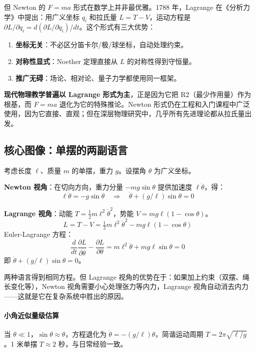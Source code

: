 但 Newton 的 $F = ma$ 形式在数学上并非最优雅。1788 年，Lagrange 在《分析力学》中提出：用广义坐标 $q_i$ 和拉氏量 $L = T - V$，运动方程是 $\partial L/\partial q_i = d(\partial L/\partial \dot{q}_i)/dt$。这个形式有三大优势：
\begin{enumerate}
\item \textbf{坐标无关}：不必区分笛卡尔/极/球坐标，自动处理约束。
\item \textbf{对称性显式}：Noether 定理直接从 $L$ 的对称性得到守恒量。
\item \textbf{推广无碍}：场论、相对论、量子力学都使用同一框架。
\end{enumerate}

\textbf{现代物理教学普遍以 Lagrange 形式为主}，正是因为它把 R2（最少作用量）作为根基，而 $F = ma$ 退化为它的特殊推论。Newton 形式仍在工程和入门课程中广泛使用，因为它直接、直观；但在深层物理研究中，几乎所有先进理论都从拉氏量出发。

\subsection{核心图像：单摆的两副语言}

考虑长度 $\ell$、质量 $m$ 的单摆，重力 $g$。设摆角 $\theta$ 为广义坐标。

\textbf{Newton 视角}：在切向方向，重力分量 $-mg\sin\theta$ 提供加速度 $\ell\ddot\theta$，得：
\[
\ell\ddot\theta = -g\sin\theta \quad \Rightarrow \quad \ddot\theta + (g/\ell)\sin\theta = 0
\]

\textbf{Lagrange 视角}：动能 $T = \tfrac{1}{2}m\ell^2\dot\theta^2$，势能 $V = mg\ell(1-\cos\theta)$。
\[
L = T - V = \tfrac{1}{2}m\ell^2\dot\theta^2 - mg\ell(1-\cos\theta)
\]
Euler-Lagrange 方程：
\[
\frac{d}{dt}\frac{\partial L}{\partial \dot\theta} - \frac{\partial L}{\partial \theta} = m\ell^2\ddot\theta + mg\ell\sin\theta = 0
\]
即 $\ddot\theta + (g/\ell)\sin\theta = 0$。

两种语言得到相同方程。但 Lagrange 视角的优势在于：如果加上约束（双摆、绳长变化等），Newton 视角需要小心处理张力等内力，Lagrange 视角自动消去内力——这就是它在复杂系统中胜出的原因。

\paragraph{小角近似量级估算} 当 $\theta \ll 1$，$\sin\theta \approx \theta$，方程退化为 $\ddot\theta = -(g/\ell)\theta$，简谐运动周期 $T = 2\pi\sqrt{\ell/g}$。1 米单摆 $T \approx 2$ 秒，与日常经验一致。

